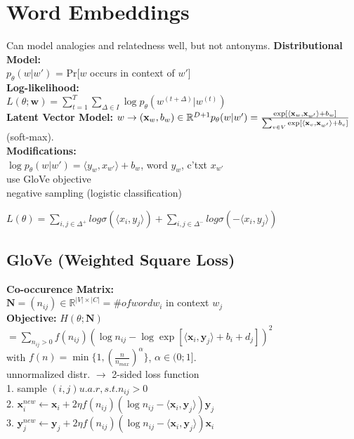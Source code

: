 \section{Word Embeddings}
Can model analogies and relatedness well, but not antonyms.
\textbf{Distributional Model:}\\
$p_\theta(w|w')$ = Pr[$w$ occurs in context of $w'$]\\
\textbf{Log-likelihood:}\\
$L(\theta; \mathbf{w}) = \sum_{t=1}^T\sum_{\Delta \in I}{\log p_\theta(w^{(t+\Delta)}|w^{(t)})}$\\
\textbf{Latent Vector Model:} $w \rightarrow (\mathbf{x}_w, b_w) \in \mathbb{R}^{D+1} \\p_{\theta}(w|w') = \frac{\exp[\langle \mathbf{x}_w,\mathbf{x}_{w'}\rangle + b_w]}{\sum_{v\in V}{\exp[\langle \mathbf{x}_v,\mathbf{x}_{w'}\rangle + b_v ]}}$ (soft-max).\\
\textbf{Modifications:}\\
$\log p_{\theta}(w|w') = \langle  y_{w} , x_{w'} \rangle + b_w$,  word $y_w$, c'txt $x_{w'}$\\
use GloVe objective\\
negative sampling (logistic classification)

$L(\theta) = \sum_{i,j \in \Delta^+} log \sigma(\langle x_i, y_j \rangle) + \sum_{i,j \in \Delta^-} log \sigma(- \langle x_i, y_j \rangle)$

\subsection*{GloVe (Weighted Square Loss)}
\textbf{Co-occurence Matrix:}\\
$\mathbf{N} = (n_{ij}) \in \mathbb{R}^{|V|\times|C|} = \# of word w_i$ in context $w_j$\\
\textbf{Objective:} $H(\theta;\mathbf{N})$\\
$= \sum_{n_{ij} > 0} f(n_{ij})(\log n_{ij} - \log \exp[\langle \mathbf{x}_i, \mathbf{y}_j \rangle + b_i + d_j])^2$\\
with $f(n) = \min\{1, (\frac{n}{n_{max}})^\alpha\}$, $\alpha \in (0;1]$.\\
unnormalized distr. $\rightarrow$ 2-sided loss function\\
1. sample $(i,j) u.a.r, s.t. n_{ij}>0$\\
2. $\mathbf{x}_i^{new} \leftarrow \mathbf{x}_i + 2\eta f(n_{ij})(\log n_{ij} - \langle \mathbf{x}_i, \mathbf{y}_j \rangle)\mathbf{y}_j$\\
3. $\mathbf{y}_j^{new} \leftarrow \mathbf{y}_j + 2\eta f(n_{ij})(\log n_{ij} - \langle \mathbf{x}_i, \mathbf{y}_j \rangle)\mathbf{x}_i$
